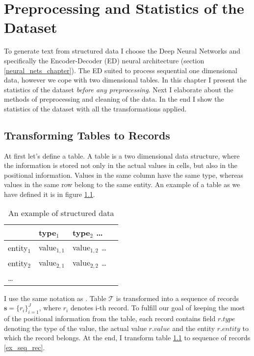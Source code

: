 \chapter{Preprocessing and Statistics of the Dataset} \label{chapPreproc}

To generate text from structured data I choose the Deep Neural Networks and specifically the Encoder-Decoder (ED) neural architecture (section \ref{neural_nets_chapter}). The ED suited to process sequential one dimensional data, however we cope with two dimensional tables. In this chapter I present the statistics of the dataset \emph{before any preprocessing}. Next I elaborate about the methods of preprocessing and cleaning of the data. In the end I show the statistics of the dataset with all the transformations applied.

\section{Transforming Tables to Records} \label{table_to_record_trans}

At first let's define a table. A table is a two dimensional data structure, where the information is stored not only in the actual values in cells, but also in the positional information. Values in the same column have the same type, whereas values in the same row belong to the same entity. An example of a table as we have defined it is in figure \ref{ex_struct}.

\begin{table}[h]
    \centering
    \begin{tabular}{llll}
        \toprule
        {} & type$_1$ & type$_2$ \dots \\
        \midrule
        entity$_1$ & value$_{1,1}$ &  value$_{1,2}$ \dots \\
        entity$_2$ & value$_{2,1}$ & value$_{2,2}$ \dots \\
        \dots &&
    \end{tabular}
    \caption{An example of structured data} \label{ex_struct}
\end{table}

I use the same notation as \citep{liang-etal-2009-learning}. Table $\mathcal{T}$ is transformed into a sequence of records $ \mathbf{s} = \{ r_i \}_{i=1}^{J} $, where $r_i$ denotes i-th record. To fulfill our goal of keeping the most of the positional information from the table, each record contains field $r.type$ denoting the type of the value, the actual value $r.value$ and the entity $r.entity$ to which the record belongs. At the end, I transform table \ref{ex_struct} to sequence of records \ref{ex_seq_rec}.

